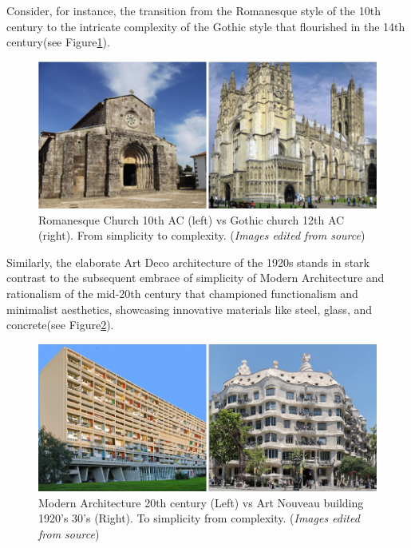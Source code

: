 Consider, for instance, the transition from the Romanesque style of the 10th century to the intricate complexity of the Gothic style that flourished in the 14th century\cite{Arora2023}(see Figure\ref{fig:RomanesquevsGothic}).
     \begin{figure}[htb]
          \centering
          \includegraphics[width= \linewidth]{Images/RomanesqueVsGothic}
          \caption{Romanesque Church 10th AC (left) vs Gothic church 12th AC (right). From simplicity to complexity. (\textit{Images edited from source})}
          \label{fig:RomanesquevsGothic}
        \end{figure}
Similarly, the elaborate Art Deco architecture of the 1920s stands in stark contrast to the subsequent embrace of simplicity of Modern Architecture and rationalism  of the mid-20th century that championed functionalism and minimalist aesthetics, showcasing innovative materials like steel, glass, and concrete\cite{Stacbond2020}(see Figure\ref{fig:ArtNouveauVsModernism}).

     \begin{figure}[htb]
          \centering
          \includegraphics[width= \linewidth]{Images/ArtNouveauVsModernism}
          \caption{Modern Architecture 20th century (Left) vs Art Nouveau building 1920's 30's (Right). To simplicity from complexity. (\textit{Images edited from source})}
          \label{fig:ArtNouveauVsModernism}
        \end{figure}

